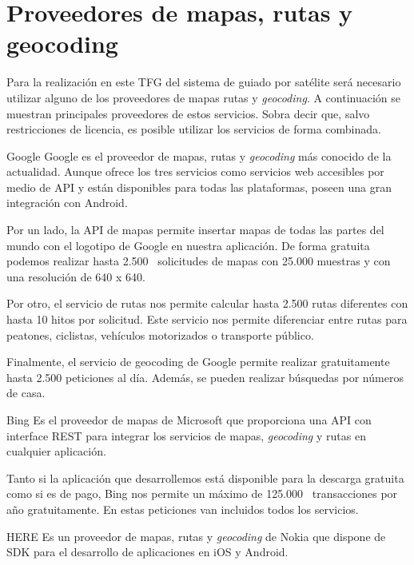 \section{Proveedores de mapas, rutas y geocoding}
\label{sec:proveedores}

Para la realización en este \acs{TFG} del sistema de guiado por satélite será necesario utilizar
alguno de los proveedores de mapas rutas y \emph{geocoding}. A continuación se muestran principales
proveedores de estos servicios. Sobra decir que, salvo restricciones de licencia, es posible
utilizar los servicios de forma combinada.

\begin{definitionlist}
  \item[Google] Google es el proveedor de mapas, rutas y \emph{geocoding} más conocido de la
    actualidad. Aunque ofrece los tres servicios como servicios web accesibles por medio de
    \acs{API} y están disponibles para todas las plataformas, poseen una gran integración con
    Android.

    Por un lado, la \acs{API} de mapas permite insertar mapas de todas las partes del mundo con el
    logotipo de Google en nuestra aplicación. De forma gratuita podemos realizar hasta
    2.500~\cite{LicenciaAndroid} solicitudes de mapas con 25.000 muestras y con una resolución de
    640 x 640.

    Por otro, el servicio de rutas nos permite calcular hasta 2.500 rutas diferentes con hasta 10
    hitos por solicitud. Este servicio nos permite diferenciar entre rutas para peatones, ciclistas,
    vehículos motorizados o transporte público.

    Finalmente, el servicio de geocoding de Google permite realizar gratuitamente hasta 2.500
    peticiones al día. Además, se pueden realizar búsquedas por números de casa.

  \item[Bing] Es el proveedor de mapas de Microsoft que proporciona una \acs{API} con interface
    \acf{REST} para integrar los servicios de mapas, \emph{geocoding} y rutas en cualquier
    aplicación.

    Tanto si la aplicación que desarrollemos está disponible para la descarga gratuita como si es de
    pago, Bing nos permite un máximo de 125.000~\cite{LicenciaMicrosoft} transacciones por año
    gratuitamente. En estas peticiones van incluidos todos los servicios.

  \item[HERE] Es un proveedor de mapas, rutas y \emph{geocoding} de Nokia que dispone de \acf{SDK}
    para el desarrollo de aplicaciones en iOS y Android.


\end{definitionlist}
